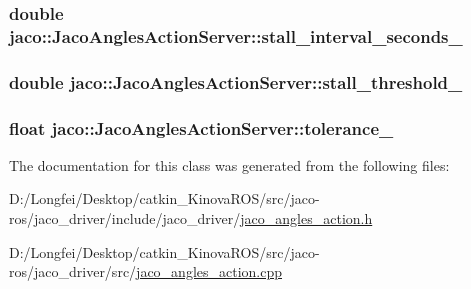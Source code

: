 \subsubsection[{\texorpdfstring{stall\+\_\+interval\+\_\+seconds\+\_\+}{stall_interval_seconds_}}]{\setlength{\rightskip}{0pt plus 5cm}double jaco\+::\+Jaco\+Angles\+Action\+Server\+::stall\+\_\+interval\+\_\+seconds\+\_\+\hspace{0.3cm}{\ttfamily [private]}}\hypertarget{classjaco_1_1JacoAnglesActionServer_a2bf773e52f5d3751001415e8121fe276}{}\label{classjaco_1_1JacoAnglesActionServer_a2bf773e52f5d3751001415e8121fe276}
\subsubsection[{\texorpdfstring{stall\+\_\+threshold\+\_\+}{stall_threshold_}}]{\setlength{\rightskip}{0pt plus 5cm}double jaco\+::\+Jaco\+Angles\+Action\+Server\+::stall\+\_\+threshold\+\_\+\hspace{0.3cm}{\ttfamily [private]}}\hypertarget{classjaco_1_1JacoAnglesActionServer_a7372c88107de61bb149cea6a60932f71}{}\label{classjaco_1_1JacoAnglesActionServer_a7372c88107de61bb149cea6a60932f71}
\subsubsection[{\texorpdfstring{tolerance\+\_\+}{tolerance_}}]{\setlength{\rightskip}{0pt plus 5cm}float jaco\+::\+Jaco\+Angles\+Action\+Server\+::tolerance\+\_\+\hspace{0.3cm}{\ttfamily [private]}}\hypertarget{classjaco_1_1JacoAnglesActionServer_acc1edd1f538d1bf9c05c91c94a4abfa1}{}\label{classjaco_1_1JacoAnglesActionServer_acc1edd1f538d1bf9c05c91c94a4abfa1}


The documentation for this class was generated from the following files\+:\begin{DoxyCompactItemize}
\item 
D\+:/\+Longfei/\+Desktop/catkin\+\_\+\+Kinova\+R\+O\+S/src/jaco-\/ros/jaco\+\_\+driver/include/jaco\+\_\+driver/\hyperlink{jaco__angles__action_8h}{jaco\+\_\+angles\+\_\+action.\+h}\item 
D\+:/\+Longfei/\+Desktop/catkin\+\_\+\+Kinova\+R\+O\+S/src/jaco-\/ros/jaco\+\_\+driver/src/\hyperlink{jaco__angles__action_8cpp}{jaco\+\_\+angles\+\_\+action.\+cpp}\end{DoxyCompactItemize}
